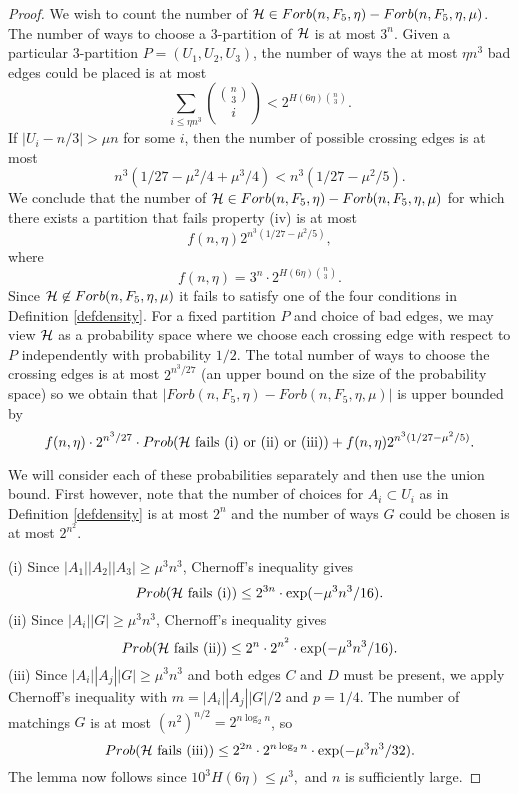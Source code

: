 \documentclass[11pt]{article}
\begin{document}
\begin{proof}
We wish to count the number of  $\mathcal{H} \in Forb(n, F_5, \eta)-Forb(n,
F_5, \eta, \mu)$. The number of ways to choose a $3$-partition of
$\mathcal{H}$ is at most $3^n$. Given a particular $3$-partition $P=(U_1,
U_2, U_3)$, the number of ways the at most $\eta n^3$ bad edges
could be placed is at most
$$\sum_{i\le \eta n^3} {{n \choose 3} \choose i}< 2^{H(6\eta){n \choose 3}}.$$
If $|U_i-n/3|>\mu n$ for some $i$, then the number of possible
crossing edges is at most
$$n^3(1/27-\mu^2/4+\mu^3/4)<n^3(1/27-\mu^2/5).$$ We conclude that the number of
$\mathcal{H} \in Forb(n, F_5, \eta)-Forb(n, F_5, \eta, \mu)$ for which there exists a partition that
 fails property (iv) is at most
$$ f(n, \eta) 2^{n^3(1/27-\mu^2/5)},$$
where
$$f(n, \eta)=3^n \cdot 2^{H(6\eta){n \choose 3}}.$$
Since $\mathcal{H} \not\in Forb(n, F_5, \eta, \mu)$ it fails to satisfy one of the four conditions in Definition \ref{defdensity}.
  For a fixed partition $P$ and choice of bad edges, we may view $\mathcal{H}$ as a probability space where we choose
   each crossing edge with respect to $P$ independently with probability $1/2$.
 The total number of ways to choose the crossing edges is at most $2^{n^3/27}$ (an upper bound on the size of the
 probability space) so we obtain that $|Forb(n,F_5,\eta)-Forb(n,F_5,\eta,\mu)|$ is upper bounded by
 $$f(n, \eta) \cdot 2^{n^3/27} \cdot Prob(\mathcal{H} \hbox{ fails (i) or (ii) or (iii)})+f(n, \eta) 2^{n^3(1/27-\mu^2/5)}.$$

 We will consider each of these probabilities separately and then use the union bound.  First however, note that
 the number of
choices for $A_i \subset U_i$ as in Definition \ref{defdensity} is at most $2^n$ and the number of ways $G$
could be chosen is at most $2^{n^2}$.

(i) Since  $|A_1||A_2||A_3| \ge \mu^3 n^3$, Chernoff's inequality
gives
$$Prob(\mathcal{H} \hbox{ fails (i)}) \le 2^{3n} \cdot
\exp(-\mu^3 n^3/16).$$
(ii) Since  $|A_i||G| \ge \mu^3 n^3$, Chernoff's inequality gives
$$Prob(\mathcal{H} \hbox{ fails (ii)}) \le 2^{n} \cdot 2^{n^2}\cdot \exp(-\mu^3 n^3/16).$$
(iii) Since $|A_i||A_j||G| \ge \mu^3 n^3$ and  both edges $C$ and $D$ must be present, we apply
Chernoff's inequality with $m=|A_i||A_j||G|/2$ and $p=1/4$. The number of matchings $G$ is at most $(n^2)^{n/2}=2^{n\log_2 n}$, so
$$Prob(\mathcal{H} \hbox{ fails (iii)}) \le 2^{2n} \cdot 2^{n\log_2 n}\cdot \exp(-\mu^3 n^3/32).$$
The lemma now follows since $10^3H(6\eta)\le \mu^3,$ and $n$ is sufficiently large.
\end{proof}
\end{document}
